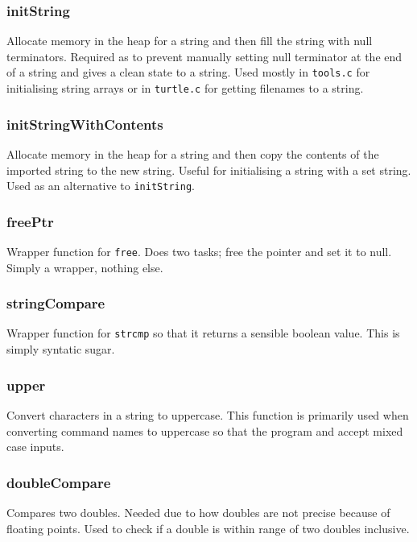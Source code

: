 \documentclass[a4paper, 12pt, titlepage]{article}
\newcommand{\code}[1]{\small\texttt{#1}\normalsize}
\begin{document}
\subsubsection{initString}

Allocate memory in the heap for a string and then fill the string with null 
terminators. Required as to prevent manually setting null terminator at the 
end of a string and gives a clean state to a string. Used mostly in 
\code{tools.c} for initialising string arrays or in \code{turtle.c} for 
getting filenames to a string.

\subsubsection{initStringWithContents}

Allocate memory in the heap for a string and then copy the contents of the 
imported string to the new string. Useful for initialising a string with a
set string. Used as an alternative to \code{initString}.

\subsubsection{freePtr}

Wrapper function for \code{free}. Does two tasks; free the pointer and 
set it to null. Simply a wrapper, nothing else.

\subsubsection{stringCompare}

Wrapper function for \code{strcmp} so that it returns a sensible boolean 
value. This is simply syntatic sugar.

\subsubsection{upper}

Convert characters in a string to uppercase. This function is primarily
used when converting command names to uppercase so that the program and 
accept mixed case inputs.

\subsubsection{doubleCompare}

Compares two doubles. Needed due to how doubles are not precise because of 
floating points. Used to check if a double is within range of two doubles 
inclusive.
\end{document}
